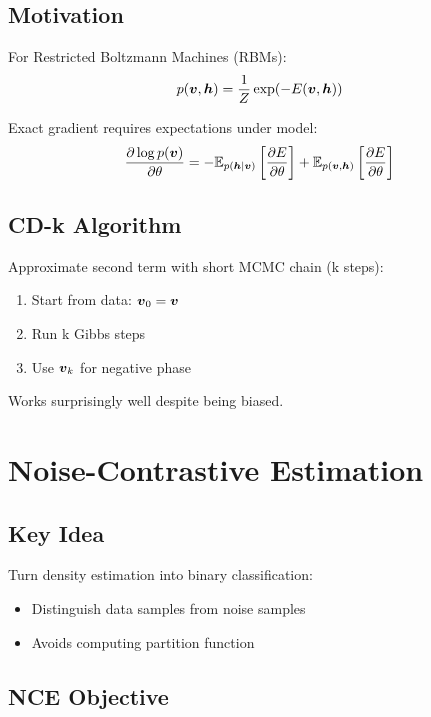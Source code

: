 \subsection{Motivation}

For Restricted Boltzmann Machines (RBMs):
\begin{equation}
p(\boldsymbol{v}, \boldsymbol{h}) = \frac{1}{Z} \exp(-E(\boldsymbol{v}, \boldsymbol{h}))
\end{equation}

Exact gradient requires expectations under model:
\begin{equation}
\frac{\partial \log p(\boldsymbol{v})}{\partial \theta} = -\mathbb{E}_{p(\boldsymbol{h}|\boldsymbol{v})}\left[\frac{\partial E}{\partial \theta}\right] + \mathbb{E}_{p(\boldsymbol{v}, \boldsymbol{h})}\left[\frac{\partial E}{\partial \theta}\right]
\end{equation}

\subsection{CD-k Algorithm}

Approximate second term with short MCMC chain (k steps):
\begin{enumerate}
    \item Start from data: $\boldsymbol{v}_0 = \boldsymbol{v}$
    \item Run k Gibbs steps
    \item Use $\boldsymbol{v}_k$ for negative phase
\end{enumerate}

Works surprisingly well despite being biased.

\section{Noise-Contrastive Estimation}
\label{sec:nce}

\subsection{Key Idea}

Turn density estimation into binary classification:
\begin{itemize}
    \item Distinguish data samples from noise samples
    \item Avoids computing partition function
\end{itemize}

\subsection{NCE Objective}

